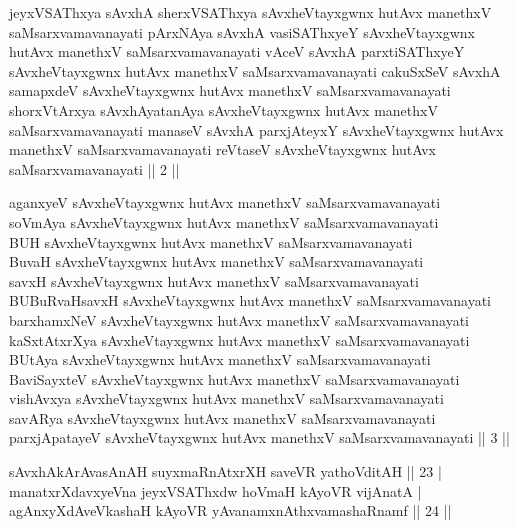 
\begin{shl}
jeyxVSAThxya sAvxhA sherxVSAThxya sAvxheVtayxgwnx hutAvx manethxV saMsarxvamavanayati pArxNAya sAvxhA vasiSAThxyeY sAvxheVtayxgwnx hutAvx manethxV saMsarxvamavanayati vAceV sAvxhA parxtiSAThxyeY sAvxheVtayxgwnx hutAvx manethxV saMsarxvamavanayati cakuSxSeV sAvxhA samapxdeV sAvxheVtayxgwnx hutAvx manethxV saMsarxvamavanayati shorxVtArxya sAvxhAyatanAya sAvxheVtayxgwnx hutAvx manethxV saMsarxvamavanayati manaseV sAvxhA parxjAteyxY sAvxheVtayxgwnx hutAvx manethxV saMsarxvamavanayati reVtaseV sAvxheVtayxgwnx hutAvx saMsarxvamavanayati || 2 ||
\end{shl}

\begin{shl}
aganxyeV sAvxheVtayxgwnx hutAvx manethxV saMsarxvamavanayati \\
soVmAya sAvxheVtayxgwnx hutAvx manethxV saMsarxvamavanayati \\
BUH sAvxheVtayxgwnx hutAvx manethxV saMsarxvamavanayati\\
BuvaH sAvxheVtayxgwnx hutAvx manethxV saMsarxvamavanayati \\
savxH sAvxheVtayxgwnx hutAvx manethxV saMsarxvamavanayati \\
BUBuRvaHsavxH sAvxheVtayxgwnx hutAvx manethxV saMsarxvamavanayati \\
barxhamxNeV sAvxheVtayxgwnx hutAvx manethxV saMsarxvamavanayati \\
kaSxtAtxrXya sAvxheVtayxgwnx hutAvx manethxV saMsarxvamavanayati \\
BUtAya sAvxheVtayxgwnx hutAvx manethxV saMsarxvamavanayati \\
BaviSayxteV sAvxheVtayxgwnx hutAvx manethxV saMsarxvamavanayati \\
vishAvxya sAvxheVtayxgwnx hutAvx manethxV saMsarxvamavanayati \\
savARya sAvxheVtayxgwnx hutAvx manethxV saMsarxvamavanayati \\
parxjApatayeV sAvxheVtayxgwnx hutAvx manethxV saMsarxvamavanayati || 3 ||
\end{shl}


\begin{shl}
sAvxhAkArAvasAnAH suyxmaRnAtxrXH saveVR yathoVditAH \hfill|| 23 | \\
manatxrXdavxyeVna jeyxVSAThxdw hoVmaH kAyoVR vijAnatA | \\
agAnxyXdAveVkashaH kAyoVR yAvanamxnAthxvamashaRnamf \hfill|| 24 || 
\end{shl}

